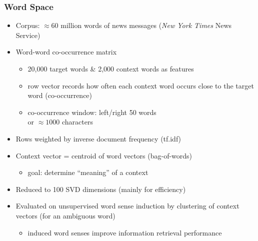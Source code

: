 \begin{frame}
  \frametitle{Word Space \citep{Schuetze:92,Schuetze:93,Schuetze:98}}

  \begin{itemize}
  \item Corpus: $\approx 60$ million words of news messages (\emph{New York Times} News Service)
  \item Word-word co-occurrence matrix
    \begin{itemize}
    \item 20,000 target words \& 2,000 context words as features
    \item row vector records how often each context word occurs close
      to the target word (co-occurrence)
    \item co-occurrence window: left/right 50 words \citep{Schuetze:98}\\
      or $\approx 1000$ characters \citep{Schuetze:92}
    \end{itemize}
  \item Rows weighted by inverse document frequency (tf.idf)
  \item Context vector = centroid of word vectors (bag-of-words)
    \begin{itemize}
    \item[\hand] goal: determine ``meaning'' of a context
    \end{itemize}
  \item Reduced to 100 SVD dimensions (mainly for efficiency)
  \item Evaluated on unsupervised word sense induction by clustering
    of context vectors (for an ambiguous word)
    \begin{itemize}
    \item induced word senses improve information retrieval performance
    \end{itemize}
  \end{itemize}
\end{frame}

